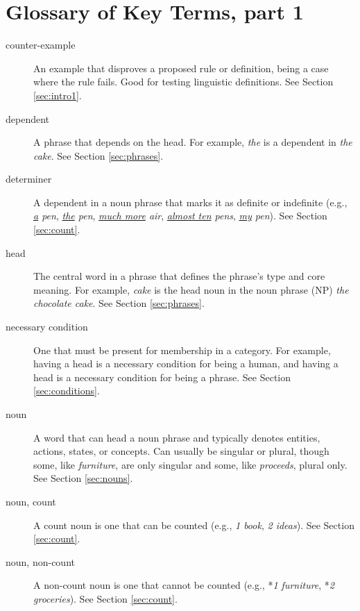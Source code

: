\newpage
\section{Glossary of Key Terms, part 1}
\begin{description}
   
   \item[counter-example] An example that disproves a proposed rule or definition, being a case where the rule fails. Good for testing linguistic definitions. See Section \ref{sec:intro1}.
   
   \item[dependent] A phrase that depends on the head. For example, \textit{the} is a dependent in \textit{the cake}. See Section \ref{sec:phrases}.
   
   \item[determiner] A dependent in a noun phrase that marks it as definite or indefinite (e.g., \textit{\uline{a} pen}, \textit{\uline{the} pen}, \textit{\uline{much more} air}, \textit{\uline{almost ten} pens}, \textit{\uline{my} pen}). See Section \ref{sec:count}.
   
   \item[head] The central word in a phrase that defines the phrase's type and core meaning. For example, \textit{cake} is the head noun in the noun phrase (NP) \textit{the chocolate cake}.  See Section \ref{sec:phrases}.
   
   \item[necessary condition] One that must be present for membership in a category. For example, having a head is a necessary condition for being a human, and having a head is a necessary condition for being a phrase. See Section \ref{sec:conditions}.
   
   \item[noun] A word that can head a noun phrase and typically denotes entities, actions, states, or concepts. Can usually be singular or plural, though some, like \textit{furniture}, are only singular and some, like \textit{proceeds}, plural only. See Section \ref{sec:nouns}.

       \item[noun, count] A count noun is one that can be counted (e.g., \textit{1 book}, \textit{2 ideas}). See Section \ref{sec:count}.
   
   \item[noun, non-count] A non-count noun is one that cannot be counted (e.g., *\textit{1 furniture}, *\textit{2 groceries}). See Section \ref{sec:count}.
   

\end{description}
